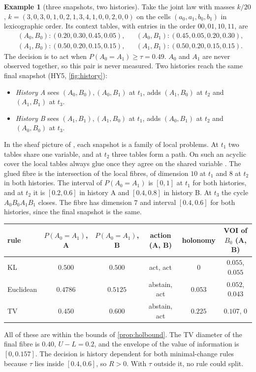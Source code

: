 \documentclass[11pt]{article}
\theoremstyle{definition}\newtheorem{definition}[theorem]{Definition}\newtheorem{remark}[theorem]{Remark}\newtheorem{example}[theorem]{Example}\newtheorem{problem}[theorem]{Open problem}\crefname{problem}{Problem}{Problems}
\begin{document}
\begin{example}[three snapshots, two histories]\label{ex:history}
Take the joint law with masses $k/20$, $k=(3,0,3,0,1,0,2,1,3,4,1,0,0,2,0,0)$ on the cells $(a_0,a_1,b_0,b_1)$ in lexicographic order. Its context tables, with entries in the order $00,01,10,11$, are
\[
\begin{aligned}
&(A_0,B_0):(0.20,0.30,0.45,0.05), && (A_0,B_1):(0.45,0.05,0.20,0.30),\\
&(A_1,B_0):(0.50,0.20,0.15,0.15), && (A_1,B_1):(0.50,0.20,0.15,0.15).
\end{aligned}
\]
The decision is to act when $P(A_0=A_1)\ge\tau=0.49$. $A_0$ and $A_1$ are never observed together, so this pair is never measured. Two histories reach the same final snapshot (HY5, \cref{fig:history}):
\begin{itemize}
\item \emph{History A} sees $(A_0,B_0),(A_0,B_1)$ at $t_1$, adds $(A_1,B_0)$ at $t_2$ and $(A_1,B_1)$ at $t_3$.
\item \emph{History B} sees $(A_1,B_1),(A_1,B_0)$ at $t_1$, adds $(A_0,B_1)$ at $t_2$ and $(A_0,B_0)$ at $t_3$.
\end{itemize}
In the sheaf picture of \cite{TohmeCaterinaGangle2017}, each snapshot is a family of local problems. At $t_1$ two tables share one variable, and at $t_2$ three tables form a path. On such an acyclic cover the local tables always glue once they agree on the shared variable \cite{Vorobev1962}. The glued fibre is the intersection of the local fibres, of dimension $10$ at $t_1$ and $8$ at $t_2$ in both histories. The interval of $P(A_0=A_1)$ is $[0,1]$ at $t_1$ for both histories, and at $t_2$ it is $[0.2,0.6]$ in history A and $[0.4,0.8]$ in history B. At $t_3$ the cycle $A_0B_0A_1B_1$ closes. The fibre has dimension $7$ and interval $[0.4,0.6]$ for both histories, since the final snapshot is the same.
\begin{center}\small
\begin{tabular}{lccccc}
\toprule
rule & $P(A_0=A_1)$, A & $P(A_0=A_1)$, B & action (A, B) & holonomy & VOI of $B_0$ (A, B)\\\midrule
KL & $0.500$ & $0.500$ & act, act & $0$ & $0.055$, $0.055$\\
Euclidean & $0.4786$ & $0.5125$ & abstain, act & $0.053$ & $0.052$, $0.043$\\
TV & $0.450$ & $0.600$ & abstain, act & $0.225$ & $0.107$, $0$\\
\bottomrule
\end{tabular}
\end{center}
All of these are within the bounds of \cref{prop:holbound}. The TV diameter of the final fibre is $0.40$, $U-L=0.2$, and the envelope of the value of information is $[0,0.157]$. The decision is history dependent for both minimal-change rules because $\tau$ lies inside $[0.4,0.6]$, so $R>0$. With $\tau$ outside it, no rule could split.


\end{example}
\end{document}
